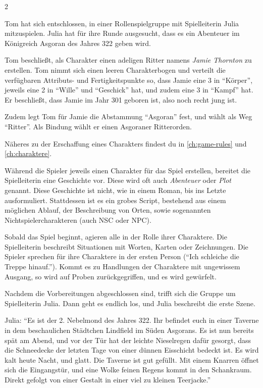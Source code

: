 \begin{multicols*}{2}
\begin{pexample}[Beispiel]
Tom hat sich entschlossen, in einer Rollenspielgruppe mit Spielleiterin Julia mitzuspielen. Julia hat für ihre Runde ausgesucht, dass es ein Abenteuer im Königreich Asgoran des Jahres 322 geben wird.

Tom beschließt, als Charakter einen adeligen Ritter namens \textit{Jamie Thornton} zu erstellen. Tom nimmt sich einen leeren Charakterbogen und verteilt die verfügbaren Attributs- und Fertigkeitspunkte so, dass Jamie eine 3 in ``Körper'', jeweils eine 2 in ``Wille'' und ``Geschick'' hat, und zudem eine 3 in ``Kampf'' hat. Er beschließt, dass Jamie im Jahr 301 geboren ist, also noch recht jung ist.

Zudem legt Tom für Jamie die Abstammung ``Asgoran'' fest, und wählt als Weg ``Ritter''. Als Bindung wählt er einen Asgoraner Ritterorden.
\end{pexample}

Näheres zu der Erschaffung eines Charakters findest du in \cref{ch:game-rules} und \cref{ch:charaktere}.

Während die Spieler jeweils einen Charakter für das Spiel erstellen, bereitet die Spielleiterin eine Geschichte vor. Diese wird oft auch \textit{Abenteuer} oder \textit{Plot} genannt. Diese Geschichte ist nicht, wie in einem Roman, bis ins Letzte ausformuliert. Stattdessen ist es ein grobes Script, bestehend aus einem möglichen Ablauf, der Beschreibung von Orten, sowie sogenannten Nichtspielercharakteren (auch NSC oder NPC).

Sobald das Spiel beginnt, agieren alle in der Rolle ihrer Charaktere. Die Spielleiterin beschreibt Situationen mit Worten, Karten oder Zeichnungen. Die Spieler sprechen für ihre Charaktere in der ersten Person (``Ich schleiche die Treppe hinauf.''). Kommt es zu Handlungen der Charaktere mit ungewissem Ausgang, so wird auf Proben zurückgegriffen, und es wird gewürfelt.

\begin{pexample}[Beispiel]
Nachdem die Vorbereitungen abgeschlossen sind, trifft sich die Gruppe um Spielleiterin Julia. Dann geht es endlich los, und Julia beschreibt die erste Szene.
\end{pexample}

\begin{pexample}
Julia: ``Es ist der 2. Nebelmond des Jahres 322. Ihr befindet euch in einer Taverne in dem beschaulichen Städtchen Lindfield im Süden Asgorans. Es ist nun bereits spät am Abend, und vor der Tür hat der leichte Nieselregen dafür gesorgt, dass die Schneedecke der letzten Tage von einer dünnen Eisschicht bedeckt ist. Es wird kalt heute Nacht, und glatt. Die Taverne ist gut gefüllt. Mit einem Knarren öffnet sich die Eingangstür, und eine Wolke feinen Regens kommt in den Schankraum. Direkt gefolgt von einer Gestalt in einer viel zu kleinen Teerjacke.''
\end{pexample}


\end{multicols*}
